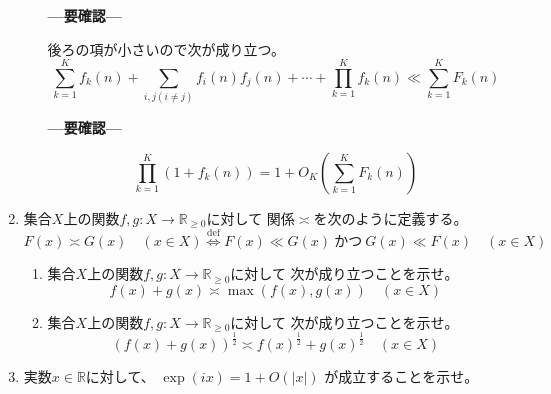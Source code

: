 \documentclass[12pt,b5paper]{ltjsarticle}
\begin{document}
\begin{enumerate}
\begin{enumerate}
            \textbf{---要確認---}

            後ろの項が小さいので次が成り立つ。
            \begin{equation}
               \sum_{k=1}^{K} f_{k}(n)
              + \sum_{i,j(i\ne j)} f_{i}(n) f_{j}(n) + \cdots
              + \prod_{k=1}^{K} f_{k}(n)
              \ll
              \sum_{k=1}^{K} F_k(n)
            \end{equation}

            \textbf{---要確認---}


            \begin{equation}
             \prod_{k=1}^{K} (1 + f_{k}(n))
              = 1 + O_{K}\left( \sum_{k=1}^{K}F_{k}(n) \right)
            \end{equation}


            \hrulefill
      \end{enumerate}

 \item
      集合$X$上の関数$f,g:X\to\mathbb{R}_{\geq 0}$に対して
      関係$\asymp$を次のように定義する。
      \begin{equation}
       F(x) \asymp G(x) \quad (x\in X)
        \overset{\mathrm{def}}{\iff}
        F(x) \ll G(x) \ \text{かつ} \ G(x) \ll F(x) \quad (x\in X)
      \end{equation}
      \begin{enumerate}
       \item
            集合$X$上の関数$f,g:X\to\mathbb{R}_{\geq 0}$に対して
            次が成り立つことを示せ。
            \begin{equation}
             f(x)+g(x) \asymp \max(f(x),g(x)) \quad (x\in X)
            \end{equation}

       \item
            集合$X$上の関数$f,g:X\to\mathbb{R}_{\geq 0}$に対して
            次が成り立つことを示せ。
            \begin{equation}
             (f(x)+g(x))^{\frac{1}{2}}
              \asymp
              f(x)^{\frac{1}{2}}+g(x)^{\frac{1}{2}} \quad (x\in X)
            \end{equation}

      \end{enumerate}


 \item
      実数$x\in\mathbb{R}$に対して、
      $\exp(ix) = 1+O(\lvert x \rvert)$
      が成立することを示せ。



\end{enumerate}
\end{document}
